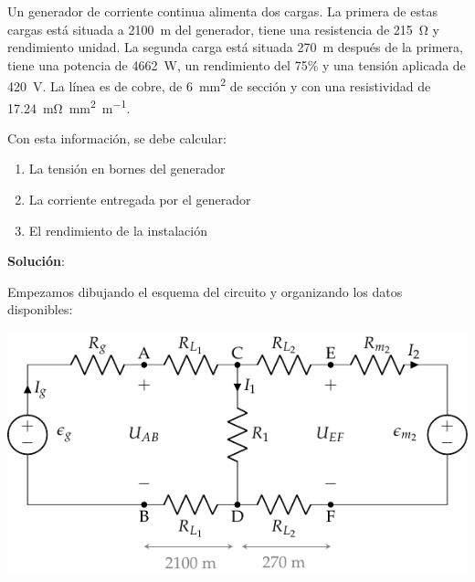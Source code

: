 \begin{example}\label{ex.motor2-bt1}

    Un generador de corriente continua alimenta dos cargas. La primera de estas cargas está situada a \qty{2100}{\meter} del generador, tiene una resistencia de \qty{215}{\ohm} y rendimiento unidad. La segunda carga está situada \qty{270}{\meter} después de la primera, tiene una potencia de \qty{4662}{\watt}, un rendimiento del 75\% y una tensión aplicada de \qty{420}{\volt}.
    La línea es de cobre, de \qty{6}{\milli\meter\squared} de sección y con una resistividad de \qty{17.24}{\milli\ohm\milli\meter\squared\per\meter}.
    
    \vspace{2mm}
    
    Con esta información, se debe calcular:
    
    \begin{enumerate}
        \item La tensión en bornes del generador
        \item La corriente entregada por el generador
        \item El rendimiento de la instalación
    \end{enumerate}
    
    \hrulefill

    \vspace{5mm} \textbf{Solución}: \vspace{4mm}

    Empezamos dibujando el esquema del circuito y organizando los datos disponibles:
    \vspace{6mm}
    
    \begin{minipage}{0.725\linewidth}
      \includegraphics[scale=1]{../figs/circuito_ejercicio2_BT1.pdf}
    \end{minipage}
    \begin{minipage}{0.275\linewidth}
    

\end{minipage}
\end{example}
